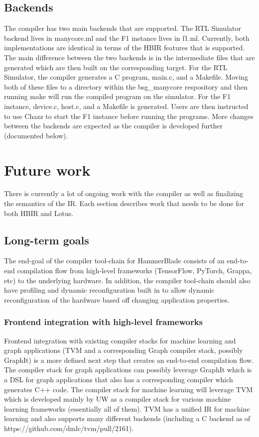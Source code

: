\documentclass{article}
\begin{document}
\subsection{Backends}
The compiler has two main backends that are supported. The RTL Simulator backend lives in manycore.ml and the F1 instance lives in f1.ml. Currently, both implementations are identical in terms of the HBIR features that is supported. The main difference between the two backends is in the intermediate files that are generated which are then built on the corresponding target. For the RTL Simulator, the compiler generates a C program, main.c, and a Makefile. Moving both of these files to a directory within the bsg\_manycore respository and then running make will run the compiled program on the simulator. For the F1 instance, device.c, host.c, and a Makefile is generated. Users are then instructed to use Chazz to start the F1 instance before running the programs. More changes between the backends are expected as the compiler is developed further (documented below).

\section{Future work}
There is currently a lot of ongoing work with the compiler as well as finalizing the semantics of the IR. Each section describes work that needs to be done for both HBIR and Lotus.

\subsection{Long-term goals}
The end-goal of the compiler tool-chain for HammerBlade consists of an end-to-end compilation flow from high-level frameworks (TensorFlow, PyTorch, Grappa, etc) to the underlying hardware. In addition, the compiler tool-chain should also have profiling and dynamic reconfiguration built in to allow dynamic reconfiguration of the hardware based off changing application properties. 

\subsubsection{Frontend integration with high-level frameworks}
Frontend integration with existing compiler stacks for machine learning and graph applications (TVM and a corresponding Graph compiler stack, possibly GraphIt) is a more defined next step that creates an end-to-end compilation flow. The compiler stack for graph applications can possibly leverage GraphIt which is a DSL for graph applications that also has a corresponding compiler which generates C++ code. The compiler stack for machine learning will leverage TVM which is developed mainly by UW as a compiler stack for various machine learning frameworks (essentially all of them). TVM has a unified IR for machine learning and also supports many different backends (including a C backend as of https://github.com/dmlc/tvm/pull/2161). \\
\end{document}
